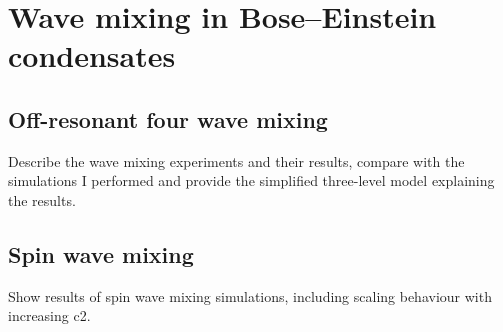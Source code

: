 \chapter{Wave mixing in Bose–Einstein condensates}\label{chap:wave_mixing}

    \section{Off-resonant four wave mixing}
    Describe the wave mixing experiments and their results, compare with the simulations I performed and provide the simplified three-level model explaining the results.

    \section{Spin wave mixing}
    Show results of spin wave mixing simulations, including scaling behaviour with increasing c2.
